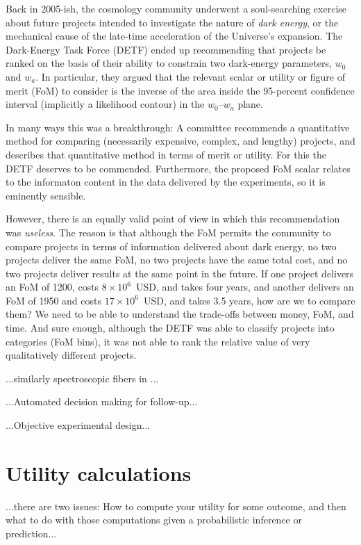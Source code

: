 \documentclass[12pt,twoside,pdftex]{article}
\begin{document}
Back in 2005-ish, the cosmology community underwent a soul-searching
exercise about future projects intended to investigate the nature of
\emph{dark energy}, or the mechanical cause of the late-time
acceleration of the Universe's expansion.  The Dark-Energy Task
Force (DETF) ended up recommending that projects be ranked on the
basis of their ability to constrain two dark-energy parameters, $w_0$
and $w_a$.  In particular, they argued that the relevant scalar or
utility or figure of merit (FoM) to consider is the inverse of the
area inside the 95-percent confidence interval (implicitly a
likelihood contour) in the $w_0$--$w_a$ plane.

In many ways this was a breakthrough: A committee recommends a
quantitative method for comparing (necessarily expensive, complex, and
lengthy) projects, and describes that quantitative method in terms of
merit or utility.  For this the DETF deserves to be commended.
Furthermore, the proposed FoM scalar relates to the informaton content
in the data delivered by the experiments, so it is eminently sensible.

However, there is an equally valid point of view in which this
recommendation was \emph{useless}.  The reason is that although the
FoM permits the community to compare projects in terms of information
delivered about dark energy, no two projects deliver the same FoM, no
two projects have the same total cost, and no two projects deliver
results at the same point in the future.  If one project delivers an
FoM of 1200, costs $8\times 10^6$~USD, and takes four years, and
another delivers an FoM of 1950 and costs $17\times 10^6$~USD, and
takes 3.5 years, how are we to compare them?  We need to be able to
understand the trade-offs between money, FoM, and time.  And sure
enough, although the DETF was able to classify projects into
categories (FoM bins), it was not able to rank the relative value of
very qualitatively different projects.

...similarly spectroscopic fibers in ...

...Automated decision making for follow-up...

...Objective experimental design...

\section{Utility calculations}

...there are two issues: How to compute your utility for some outcome,
and then what to do with those computations given a probabilistic
inference or prediction...
\end{document}
